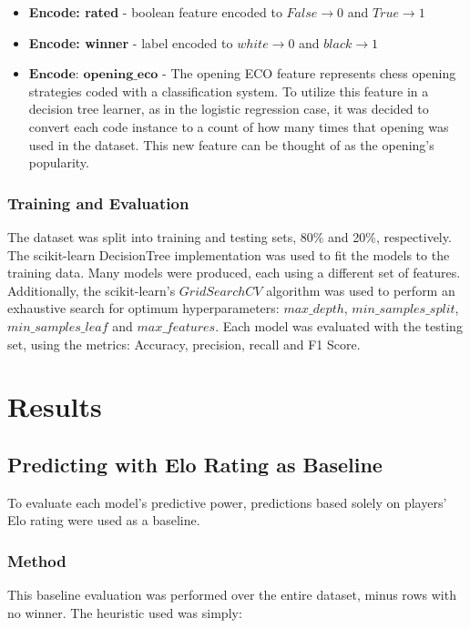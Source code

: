 \documentclass[12pt]{article}
\begin{document}
\begin{itemize}[label={}, leftmargin=0pt]
  \item \textbf{Encode: rated} - boolean feature encoded to $False \rightarrow 0$ and $True \rightarrow 1$
  \item \textbf{Encode: winner} - label encoded to $white \rightarrow 0$ and $black \rightarrow 1$
  \item $\textbf{Encode: opening\_eco}$ - The opening ECO feature represents chess opening strategies coded with a classification system. To utilize this feature in a decision tree learner, as in the logistic regression case, it was decided to convert each code instance to a count of how many times that opening was used in the dataset. This new feature can be thought of as the opening's popularity. 
\end{itemize}

\subsubsection{Training and Evaluation}
The dataset was split into training and testing sets, 80\% and 20\%, respectively. The scikit-learn DecisionTree implementation was used to fit the models to the training data. Many models were produced, each using a different set of features. Additionally, the scikit-learn's $GridSearchCV$ \cite{sklearnGSCV} algorithm was used to perform an exhaustive search for optimum hyperparameters: $max\_depth$, $min\_samples\_split$, $min\_samples\_leaf$ and $max\_features$. Each model was evaluated with the testing set, using the metrics: Accuracy, precision, recall and F1 Score.


\section{Results}
\label{sec:results}

\subsection{Predicting with Elo Rating as Baseline}
To evaluate each model's predictive power, predictions based solely on players' Elo rating were used as a baseline. 

\subsubsection{Method}
This baseline evaluation was performed over the entire dataset, minus rows with no winner. The heuristic used was simply:
\end{document}
